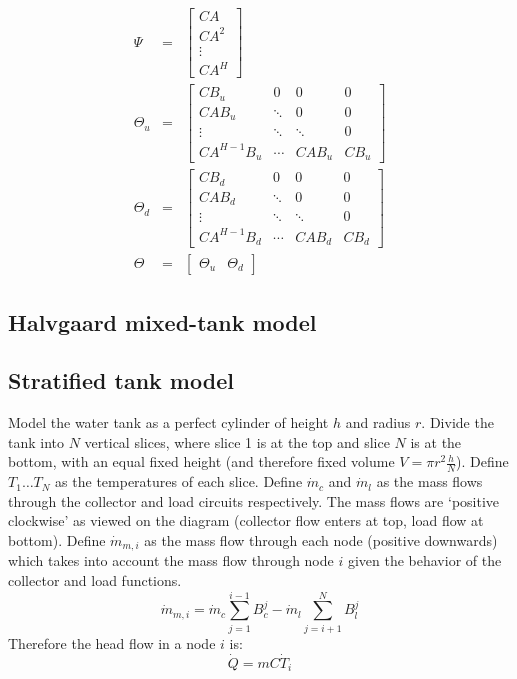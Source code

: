 \begin{eqnarray}
	\label{eq:mpc-psi}
	\Psi &=& \left[\begin{array}{c}
		CA \\ CA^2 \\ \vdots \\ CA^H
	\end{array}\right]
	\\\label{eq:mpc-theta-u}
	\Theta_u &=& \left[\begin{array}{cccc}
		CB_u & 0 & 0 & 0 \\
		CAB_u & \ddots & 0 & 0 \\
		\vdots & \ddots & \ddots & 0 \\
		CA^{H-1}B_u & \cdots & CAB_u & CB_u
	\end{array}\right]
	\\\label{eq:mpc-theta-d}
	\Theta_d &=& \left[\begin{array}{cccc}
		CB_d & 0 & 0 & 0 \\
		CAB_d & \ddots & 0 & 0 \\
		\vdots & \ddots & \ddots & 0 \\
		CA^{H-1}B_d & \cdots & CAB_d & CB_d
	\end{array}\right]
	\\\label{eq:mpc-theta}
	\Theta &=& \left[\begin{array}{cc}
		\Theta_u & \Theta_d
	\end{array}\right]
\end{eqnarray}

\subsection{Halvgaard mixed-tank model}
\label{sec:model:halvgaard}

\subsection{Stratified tank model}

Model the water tank as a perfect cylinder of height $h$ and radius $r$.
Divide the tank into $N$ vertical slices, where slice 1 is at the top and slice $N$ is at the bottom, with an equal fixed height (and therefore fixed volume $V = \pi r^2 \frac{h}{N}$).
Define $T_1 \dots T_N$ as the temperatures of each slice.
Define $\dot{m}_c$ and $\dot{m}_l$ as the mass flows through the collector and load circuits respectively.
The mass flows are `positive clockwise' as viewed on the diagram (collector flow enters at top, load flow at bottom).
Define $\dot{m}_{m, i}$ as the mass flow through each node (positive downwards) which takes into account the mass flow through node $i$ given the behavior of the collector and load functions.
$$ \dot{m}_{m, i} = \dot{m}_c \sum _{j=1} ^{i-1} B^j_c - \dot{m}_l \sum _{j=i+1} ^N B^j_l $$
Therefore the head flow in a node $i$ is:
$$ \dot{Q} = m C \dot{T}_i $$
